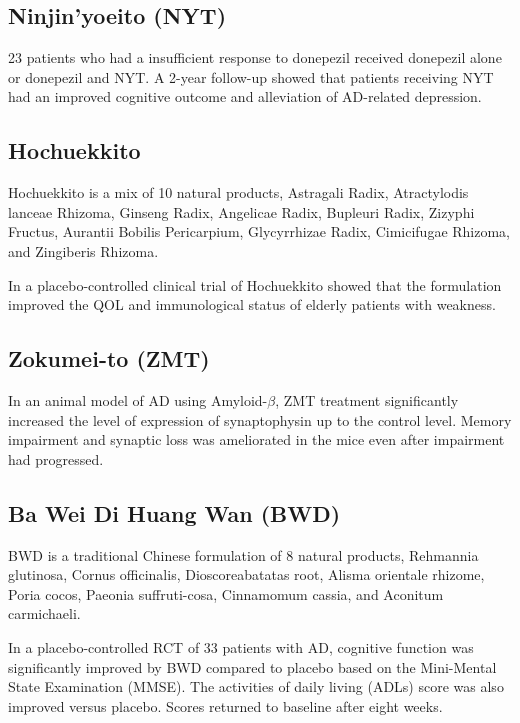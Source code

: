 \subsection{Ninjin'yoeito (NYT)}


23 patients who had a insufficient response to donepezil
received donepezil alone or donepezil and NYT.
A 2-year follow-up showed that patients receiving NYT
had an improved cognitive outcome and alleviation of AD-related depression.
\cite{kudoh2015effect}





\subsection{Hochuekkito}
Hochuekkito is a mix of 10 natural products,
Astragali Radix,
Atractylodis lanceae Rhizoma,
Ginseng Radix,
Angelicae Radix,
Bupleuri Radix,
Zizyphi Fructus,
Aurantii Bobilis Pericarpium,
Glycyrrhizae Radix,
Cimicifugae Rhizoma,
and Zingiberis Rhizoma.
\cite{kiyohara2011polysaccharide}

In a placebo-controlled clinical trial of Hochuekkito
showed that the formulation improved the QOL and immunological status
of elderly patients with weakness.
\cite{satoh2005randomized}

\subsection{Zokumei-to (ZMT)}

In an animal model of AD using Amyloid-$\beta$,
ZMT treatment significantly increased the level of expression of
synaptophysin up to the control level.
Memory impairment and synaptic loss was ameliorated in the mice
even after impairment had progressed.
\cite{tohda2003repair}



\subsection{Ba Wei Di Huang Wan (BWD)}
BWD is a traditional Chinese formulation of 8 natural products,
Rehmannia glutinosa,
Cornus officinalis,
Dioscoreabatatas root,
Alisma orientale rhizome,
Poria cocos,
Paeonia suffruti-cosa,
Cinnamomum cassia,
and Aconitum carmichaeli.

In a placebo-controlled RCT of 33 patients with AD,
cognitive function was significantly improved by BWD compared to placebo
based on the Mini-Mental State Examination (MMSE).
The activities of daily living (ADLs) score was also improved
versus placebo.
Scores returned to baseline after eight weeks.
\cite{iwasaki2004randomized}




